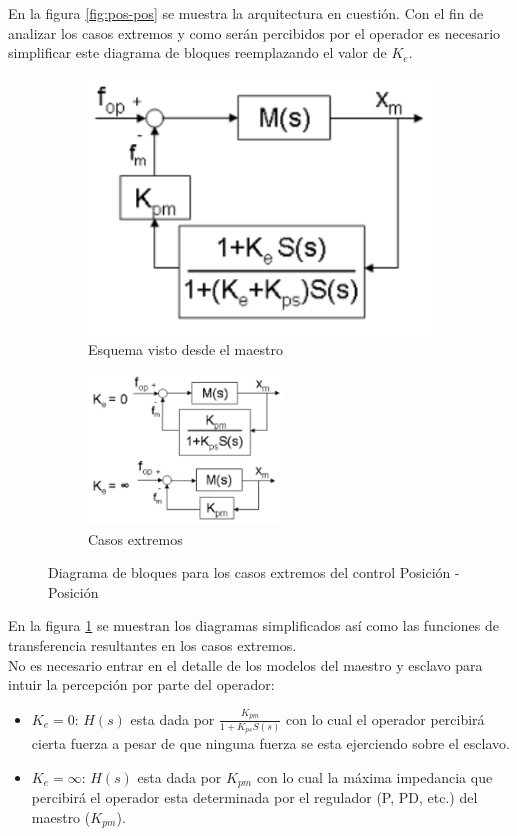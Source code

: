 En la figura \ref{fig:pos-pos} se muestra la arquitectura en cuestión. Con el fin de analizar los casos extremos y como serán percibidos por el operador es necesario simplificar este diagrama de bloques reemplazando el valor de $K_e$.
\begin{figure}[htbp]
\centering
	\begin{subfigure}[h]
		\centering
		\includegraphics[scale=0.5]{pos-pos-operator}
		\caption{Esquema visto desde el maestro}
	\end{subfigure}
	\begin{subfigure}[h]
		\centering
		\includegraphics[height=4cm]{pos-pos-kvalues}
		\caption{Casos extremos}
    \end{subfigure}
	\caption{Diagrama de bloques para los casos extremos del control Posición - Posición}
  	\label{fig:pos-pos-casos}
\end{figure}

En la figura \ref{fig:pos-pos-casos} se muestran los diagramas simplificados así como las funciones de transferencia resultantes en los casos extremos.
\\
No es necesario entrar en el detalle de los modelos del maestro y esclavo para intuir la percepción por parte del operador:
\begin{itemize}
\item $K_e = 0$: $H(s)$ esta dada por $\frac{K_{pm}}{1+K_{ps}S(s)}$ con lo cual el operador percibirá cierta fuerza a pesar de que ninguna fuerza se esta ejerciendo sobre el esclavo.
\item $K_e = \infty$: $H(s)$ esta dada por $K_{pm}$ con lo cual la máxima impedancia que percibirá el operador esta determinada por el regulador (P, PD, etc.) del maestro ($K_{pm}$).
\end{itemize}

